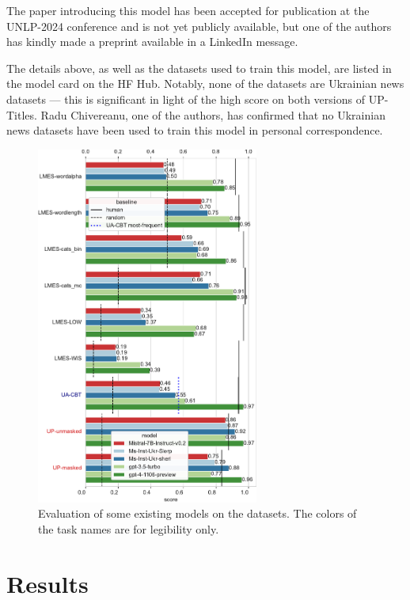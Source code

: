 The paper introducing this model has been accepted for publication at the UNLP-2024 conference and is not yet publicly available, but one of the authors has kindly made a preprint available in a LinkedIn message.

The details above, as well as the datasets used to train this model, are listed in the model card on the HF Hub. 
Notably, none of the datasets are Ukrainian news datasets — this is significant in light of the high score on both versions of UP-Titles. 
Radu Chivereanu, one of the authors, has confirmed that no Ukrainian news datasets have been used to train this model in personal correspondence.

\begin{figure}
    \centering
    \includegraphics[width=0.65\textwidth]{Figures/scores_plot_sher.pdf}
    \caption[Evaluation results of selected models]{Evaluation of some existing models on the datasets. The colors of the task names are for legibility only.}
    \label{fig:eval}
\end{figure}

\section{Results}

